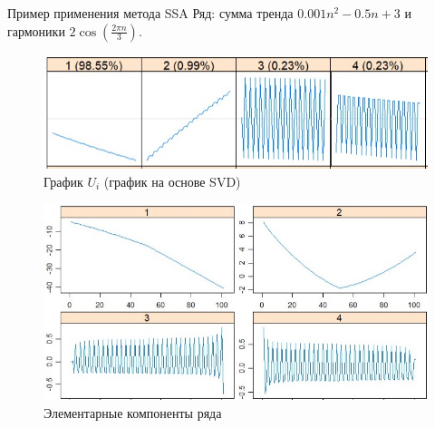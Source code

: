 \documentclass[ucs, notheorems]{beamer}
\begin{document}
\begin{frame}{Пример применения метода SSA}
\small
    Ряд: сумма тренда $0.001n^2 - 0.5n + 3$ и гармоники $2 \cos(\frac{2 \pi n} {3})$.
    \pause
    \begin{figure}
  \begin{minipage}[c]{0.5\textwidth}
    \includegraphics[scale = 0.4]{ssa_example1.jpg}
  \end{minipage}\hfill
  \begin{minipage}[l]{0.5\textwidth}
    \caption{
       \footnotesize График $U_i$ (график на основе SVD)
    } \label{fig:03-03}
  \end{minipage}
\end{figure}
    \pause
    \begin{figure}
  \begin{minipage}[c]{0.5\textwidth}
    \includegraphics[scale = 0.3]{ssa_example2.jpg}
  \end{minipage}\hfill
  \begin{minipage}[l]{0.5\textwidth}
    \caption{
       Элементарные компоненты ряда
    } \label{fig:03-03}
  \end{minipage}
\end{figure}


\end{frame}
\end{document}
